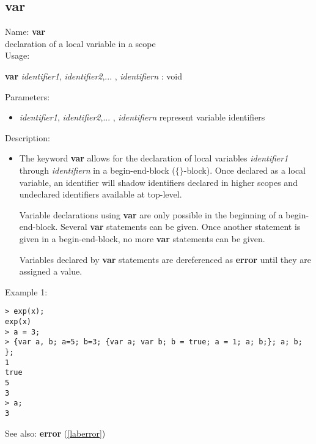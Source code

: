 \subsection{var}
\label{labvar}
\noindent Name: \textbf{var}\\
declaration of a local variable in a scope\\
\noindent Usage: 
\begin{center}
\textbf{var} \emph{identifier1}, \emph{identifier2},... , \emph{identifiern} : \textsf{void}
\end{center}
Parameters: 
\begin{itemize}
\item \emph{identifier1}, \emph{identifier2},... , \emph{identifiern} represent variable identifiers
\end{itemize}
\noindent Description: \begin{itemize}

\item The keyword \textbf{var} allows for the declaration of local variables
   \emph{identifier1} through \emph{identifiern} in a begin-end-block ($\lbrace \rbrace$-block).
   Once declared as a local variable, an identifier will shadow
   identifiers declared in higher scopes and undeclared identifiers
   available at top-level.
    
   Variable declarations using \textbf{var} are only possible in the
   beginning of a begin-end-block. Several \textbf{var} statements can be
   given. Once another statement is given in a begin-end-block, no more
   \textbf{var} statements can be given.
    
   Variables declared by \textbf{var} statements are dereferenced as \textbf{error}
   until they are assigned a value. 
\end{itemize}
\noindent Example 1: 
\begin{center}\begin{minipage}{15cm}\begin{Verbatim}[frame=single]
> exp(x); 
exp(x)
> a = 3; 
> {var a, b; a=5; b=3; {var a; var b; b = true; a = 1; a; b;}; a; b; }; 
1
true
5
3
> a;
3
\end{Verbatim}
\end{minipage}\end{center}
See also: \textbf{error} (\ref{laberror})
